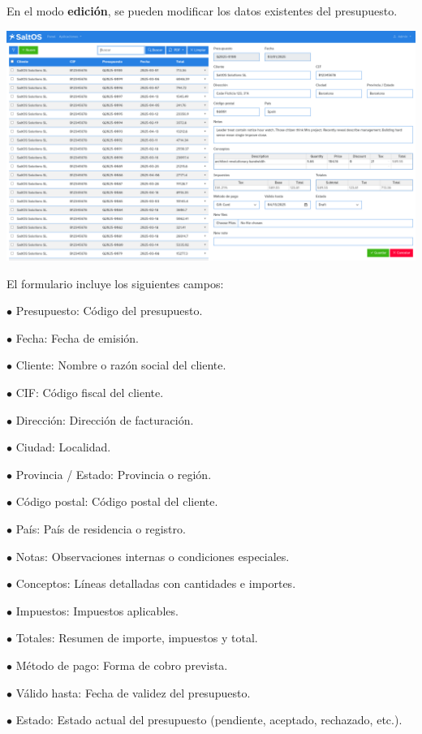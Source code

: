 \documentclass[a4paper]{article}
\begin{document}
En el modo \textbf{edición}, se pueden modificar los datos existentes del presupuesto.

\begin{center}\includegraphics[width=1\textwidth]{../ujest/snaps/test-screenshots-js-screenshots-crm-quotes-edit-100-es-es-1-snap.png}\end{center}

El formulario incluye los siguientes campos:

\begin{compactitem}
\item[\color{myblue}$\bullet$] Presupuesto: Código del presupuesto.
\item[\color{myblue}$\bullet$] Fecha: Fecha de emisión.
\item[\color{myblue}$\bullet$] Cliente: Nombre o razón social del cliente.
\item[\color{myblue}$\bullet$] CIF: Código fiscal del cliente.
\item[\color{myblue}$\bullet$] Dirección: Dirección de facturación.
\item[\color{myblue}$\bullet$] Ciudad: Localidad.
\item[\color{myblue}$\bullet$] Provincia / Estado: Provincia o región.
\item[\color{myblue}$\bullet$] Código postal: Código postal del cliente.
\item[\color{myblue}$\bullet$] País: País de residencia o registro.
\item[\color{myblue}$\bullet$] Notas: Observaciones internas o condiciones especiales.
\item[\color{myblue}$\bullet$] Conceptos: Líneas detalladas con cantidades e importes.
\item[\color{myblue}$\bullet$] Impuestos: Impuestos aplicables.
\item[\color{myblue}$\bullet$] Totales: Resumen de importe, impuestos y total.
\item[\color{myblue}$\bullet$] Método de pago: Forma de cobro prevista.
\item[\color{myblue}$\bullet$] Válido hasta: Fecha de validez del presupuesto.
\item[\color{myblue}$\bullet$] Estado: Estado actual del presupuesto (pendiente, aceptado, rechazado, etc.).
\end{compactitem}
\end{document}
